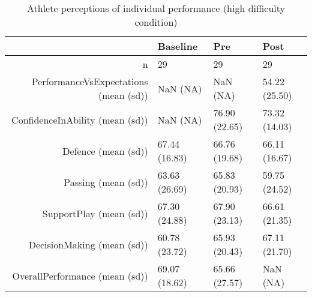 \begin{table}[ht]
\centering
\begin{tabular}{rlll}
  \hline
 & Baseline & Pre & Post \\ 
  \hline
n &    29 &    29 &    29 \\ 
  PerformanceVsExpectations (mean (sd)) &   NaN (NA) &   NaN (NA) & 54.22 (25.50) \\ 
  ConfidenceInAbility (mean (sd)) &   NaN (NA) & 76.90 (22.65) & 73.32 (14.03) \\ 
  Defence (mean (sd)) & 67.44 (16.83) & 66.76 (19.68) & 66.11 (16.67) \\ 
  Passing (mean (sd)) & 63.63 (26.69) & 65.83 (20.93) & 59.75 (24.52) \\ 
  SupportPlay (mean (sd)) & 67.30 (24.88) & 67.90 (23.13) & 66.61 (21.35) \\ 
  DecisionMaking (mean (sd)) & 60.78 (23.72) & 65.93 (20.43) & 67.11 (21.70) \\ 
  OverallPerformance (mean (sd)) & 69.07 (18.62) & 65.66 (27.57) &   NaN (NA) \\ 
   \hline
\end{tabular}
\caption{Athlete perceptions of 
 individual performance (high difficulty condition)} 
\label{tab:indPerfTimeHighTraining}
\end{table}
